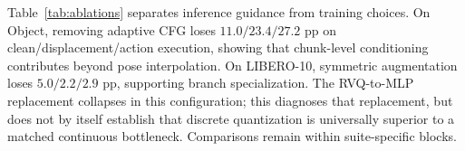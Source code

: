 \documentclass[letterpaper, 10 pt, conference]{ieeeconf}
\begin{document}
\begin{table}[t]
\caption{Fusion ablations (success, \%). Four-suite $N{=}2000/2000/4000$; matched Object $N{=}500$.}
\label{tab:main_results}
\centering
{}
\end{table}

Table~\ref{tab:ablations} separates inference guidance from training choices. On Object, removing adaptive CFG loses $11.0/23.4/27.2$ pp on clean/displacement/action execution, showing that chunk-level conditioning contributes beyond pose interpolation. On LIBERO-10, symmetric augmentation loses $5.0/2.2/2.9$ pp, supporting branch specialization. The RVQ-to-MLP replacement collapses in this configuration; this diagnoses that replacement, but does not by itself establish that discrete quantization is universally superior to a matched continuous bottleneck. Comparisons remain within suite-specific blocks.
\end{document}
